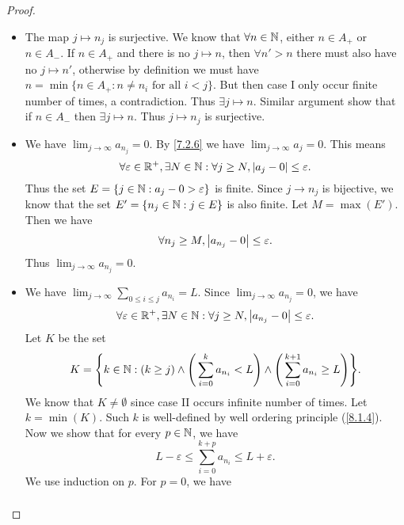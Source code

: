 \begin{proof}
\begin{itemize}
          But this means \(\sum_{n \in A_-} a_n\) is absolutely convergent, a contradiction.
          Thus case I occurs infinite number of times.
          Similar proof show that case II also occurs infinite number of times.
    \item The map \(j \mapsto n_j\) is surjective.
          We know that \(\forall n \in \mathbb{N}\), either \(n \in A_+\) or \(n \in A_-\).
          If \(n \in A_+\) and there is no \(j \mapsto n\), then \(\forall n' > n\) there must also have no \(j \mapsto n'\), otherwise by definition we must have \(n = \min\{n \in A_+ : n \neq n_i \text{ for all } i < j\}\).
          But then case I only occur finite number of times, a contradiction.
          Thus \(\exists j \mapsto n\).
          Similar argument show that if \(n \in A_-\) then \(\exists j \mapsto n\).
          Thus \(j \mapsto n_j\) is surjective.
    \item We have \(\lim_{j \to \infty} a_{n_j} = 0\).
          By \cref{7.2.6} we have \(\lim_{j \to \infty} a_j = 0\).
          This means
          \[
            \forall \varepsilon \in \mathbb{R}^+, \exists N \in \mathbb{N} : \forall j \geq N, \left\lvert a_j - 0\right\rvert \leq \varepsilon.
          \]
          Thus the set \(E = \{j \in \mathbb{N} : a_j - 0 > \varepsilon\}\) is finite.
          Since \(j \to n_j\) is bijective, we know that the set \(E' = \{n_j \in \mathbb{N} : j \in E\}\) is also finite.
          Let \(M = \max(E')\).
          Then we have
          \[
            \forall n_j \geq M, \left\lvert a_{n_j} - 0\right\rvert \leq \varepsilon.
          \]
          Thus \(\lim_{j \to \infty} a_{n_j} = 0\).
    \item We have \(\lim_{j \to \infty} \sum_{0 \leq i \leq j} a_{n_i} = L\).
          Since \(\lim_{j \to \infty} a_{n_j} = 0\), we have
          \[
            \forall \varepsilon \in \mathbb{R}^+, \exists N \in \mathbb{N} : \forall j \geq N, \left\lvert a_{n_j} - 0\right\rvert \leq \varepsilon.
          \]
          Let \(K\) be the set
          \[
            K = \Bigg\{k \in \mathbb{N} : (k \geq j) \land \Bigg(\sum_{i = 0}^k a_{n_i} < L\Bigg) \land \Bigg(\sum_{i = 0}^{k + 1} a_{n_i} \geq L\Bigg)\Bigg\}.
          \]
          We know that \(K \neq \emptyset\) since case II occurs infinite number of times.
          Let \(k = \min(K)\).
          Such \(k\) is well-defined by well ordering principle (\cref{8.1.4}).
          Now we show that for every \(p \in \mathbb{N}\), we have
          \[
            L - \varepsilon \leq \sum_{i = 0}^{k + p} a_{n_i} \leq L + \varepsilon.
          \]
          We use induction on \(p\).
          For \(p = 0\), we have
          \begin{align*}

\end{align*}
\end{itemize}
\end{proof}
